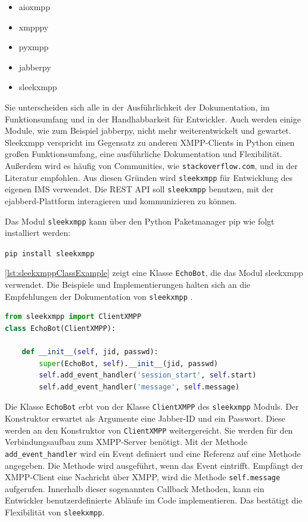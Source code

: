 \documentclass[a4paper,titlepage,halfparskip,12pt]{scrreprt}
\begin{document}
\begin{onehalfspacing}
\begin{itemize}
\item aioxmpp
\item xmpppy
\item pyxmpp
\item jabberpy
\item sleekxmpp
\end{itemize}

Sie unterscheiden sich alle in der Ausführlichkeit der Dokumentation, im Funktionsumfang und in der Handhabbarkeit für Entwickler. Auch werden einige Module, wie zum Beispiel jabberpy, nicht mehr weiterentwickelt und gewartet. Sleekxmpp \cite{pythonSleekxmpp} verspricht im Gegensatz zu anderen \acs{XMPP}-Clients in Python einen großen Funktionsumfang, eine ausführliche Dokumentation und Flexibilität. Außerdem wird es häufig von Communities, wie \texttt{stackoverflow.com}, und in der Literatur \cite{definiteGuideXMPP} empfohlen. Aus diesen Gründen wird \texttt{sleekxmpp} für Entwicklung des eigenen \acs{IMS} verwendet. Die \acs{REST} \acs{API} soll \texttt{sleekxmpp} benutzen, mit der ejabberd-Plattform interagieren und kommunizieren zu können.

Das Modul \texttt{sleekxmpp} kann über den Python Paketmanager pip wie folgt installiert werden:

\texttt{pip install sleekxmpp}

\autoref{lst:sleekxmppClassExample} zeigt eine Klasse \texttt{EchoBot}, die das Modul sleekxmpp verwendet. Die Beispiele und Implementierungen halten sich an die Empfehlungen der Dokumentation von \texttt{sleekxmpp} \cite{pythonSleekxmpp}.

\begin{lstlisting}[language=python, caption={Vorbereitungen für die Verwendung des Moduls sleekxmpp}, label={lst:sleekxmppClassExample}]
from sleekxmpp import ClientXMPP
class EchoBot(ClientXMPP):

    def __init__(self, jid, passwd):
        super(EchoBot, self).__init__(jid, passwd)
        self.add_event_handler('session_start', self.start)
        self.add_event_handler('message', self.message)
\end{lstlisting}

Die Klasse \texttt{EchoBot} erbt von der Klasse \texttt{ClientXMPP} des \texttt{sleekxmpp} Moduls. Der Konstruktor erwartet als Argumente eine Jabber-ID und ein Passwort. Diese werden an den Konstruktor von \texttt{ClientXMPP} weitergereicht. Sie werden für den Verbindungsaufbau zum \acs{XMPP}-Server benötigt. Mit der Methode \texttt{add\_event\_handler} wird ein Event definiert und eine Referenz auf eine Methode angegeben. Die Methode wird ausgeführt, wenn das Event eintrifft. Empfängt der \acs{XMPP}-Client eine Nachricht über \acs{XMPP}, wird die Methode \texttt{self.message} aufgerufen. Innerhalb dieser sogenannten Callback Methoden, kann ein Entwickler benutzerdefinierte Abläufe im Code implementieren. Das bestätigt die Flexibilität von \texttt{sleekxmpp}.


\end{onehalfspacing}
\end{document}
